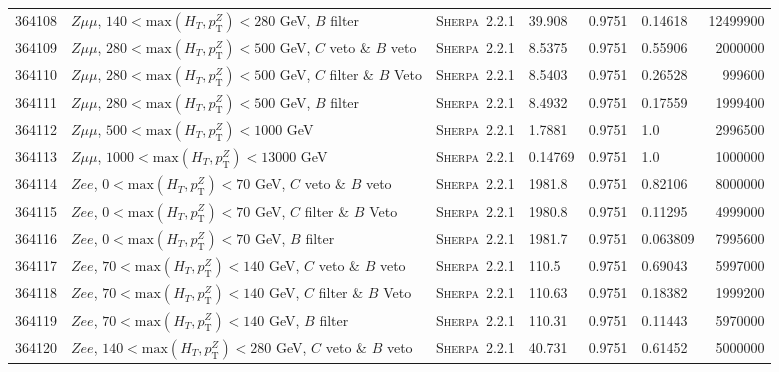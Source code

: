 \begin{table}[!htb]
{\begin{tabular}{llllllr}
      364108 & $Z \mu\mu $, $140<\text{max}(H_T,p_{\text{T}}^Z)<280$ GeV, $B$ filter & \textsc{Sherpa}~2.2.1 &              39.908      & 0.9751& 0.14618 & 12499900\\
      364109 & $Z \mu\mu $, $280<\text{max}(H_T,p_{\text{T}}^Z)<500$ GeV, $C$ veto \& $B$ veto & \textsc{Sherpa}~2.2.1 &    8.5375      & 0.9751& 0.55906 &  2000000\\
      364110 & $Z \mu\mu $, $280<\text{max}(H_T,p_{\text{T}}^Z)<500$ GeV, $C$ filter \& $B$ Veto & \textsc{Sherpa}~2.2.1 &  8.5403      & 0.9751& 0.26528 &   999600\\
      364111 & $Z \mu\mu $, $280<\text{max}(H_T,p_{\text{T}}^Z)<500$ GeV, $B$ filter & \textsc{Sherpa}~2.2.1 &              8.4932      & 0.9751& 0.17559 &  1999400\\
      364112 & $Z \mu\mu $, $500<\text{max}(H_T,p_{\text{T}}^Z)<1000$ GeV                      & \textsc{Sherpa}~2.2.1 &    1.7881      & 0.9751& 1.0     &  2996500\\
      364113 & $Z \mu\mu $, $1000<\text{max}(H_T,p_{\text{T}}^Z)<13000$ GeV                      & \textsc{Sherpa}~2.2.1 &  0.14769     & 0.9751& 1.0     &  1000000\\
      364114 & $Z ee $, $0<\text{max}(H_T,p_{\text{T}}^Z)<70$ GeV, $C$ veto \& $B$ veto & \textsc{Sherpa}~2.2.1 &        1981.8            & 0.9751& 0.82106 &    8000000\\
      364115 & $Z ee $, $0<\text{max}(H_T,p_{\text{T}}^Z)<70$ GeV, $C$ filter \& $B$ Veto & \textsc{Sherpa}~2.2.1 &      1980.8            & 0.9751& 0.11295 &    4999000\\
      364116 & $Z ee $, $0<\text{max}(H_T,p_{\text{T}}^Z)<70$ GeV, $B$ filter & \textsc{Sherpa}~2.2.1 &                  1981.7            & 0.9751& 0.063809&    7995600\\
      364117 & $Z ee $, $70<\text{max}(H_T,p_{\text{T}}^Z)<140$ GeV, $C$ veto \& $B$ veto & \textsc{Sherpa}~2.2.1 &      110.5             & 0.9751& 0.69043 &    5997000\\
      364118 & $Z ee $, $70<\text{max}(H_T,p_{\text{T}}^Z)<140$ GeV, $C$ filter \& $B$ Veto & \textsc{Sherpa}~2.2.1 &    110.63            & 0.9751& 0.18382 &    1999200\\
      364119 & $Z ee $, $70<\text{max}(H_T,p_{\text{T}}^Z)<140$ GeV, $B$ filter & \textsc{Sherpa}~2.2.1 &                110.31            & 0.9751& 0.11443 &    5970000\\
      364120 & $Z ee $, $140<\text{max}(H_T,p_{\text{T}}^Z)<280$ GeV, $C$ veto \& $B$ veto & \textsc{Sherpa}~2.2.1 &     40.731            & 0.9751& 0.61452 &    5000000\\

\end{tabular}}
\end{table}
